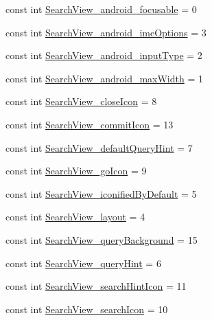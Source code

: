 \begin{CompactItemize}
\item 
const int \hyperlink{class__2doo_1_1_droid_1_1_resource_1_1_styleable_ad82578148e9f3d9db733a529f258051}{SearchView\_\-android\_\-focusable} = 0
\item 
const int \hyperlink{class__2doo_1_1_droid_1_1_resource_1_1_styleable_e42e1c73748dd445937558d5b44b7cfa}{SearchView\_\-android\_\-imeOptions} = 3
\item 
const int \hyperlink{class__2doo_1_1_droid_1_1_resource_1_1_styleable_19b755515da7d03a9b3090f07da97edc}{SearchView\_\-android\_\-inputType} = 2
\item 
const int \hyperlink{class__2doo_1_1_droid_1_1_resource_1_1_styleable_00abbba65ed503719be306f36703dfbc}{SearchView\_\-android\_\-maxWidth} = 1
\item 
const int \hyperlink{class__2doo_1_1_droid_1_1_resource_1_1_styleable_fe8b9e97dac1b0fb5b2df79c33dcc0ba}{SearchView\_\-closeIcon} = 8
\item 
const int \hyperlink{class__2doo_1_1_droid_1_1_resource_1_1_styleable_dbdef943067bd2a3dfb30eef7b5f1a0f}{SearchView\_\-commitIcon} = 13
\item 
const int \hyperlink{class__2doo_1_1_droid_1_1_resource_1_1_styleable_146beb29e45816837455fae2ac01a897}{SearchView\_\-defaultQueryHint} = 7
\item 
const int \hyperlink{class__2doo_1_1_droid_1_1_resource_1_1_styleable_e6bf16e6759447dfb7415ce257c56288}{SearchView\_\-goIcon} = 9
\item 
const int \hyperlink{class__2doo_1_1_droid_1_1_resource_1_1_styleable_0e99b7bab0fca00e621668def41b7585}{SearchView\_\-iconifiedByDefault} = 5
\item 
const int \hyperlink{class__2doo_1_1_droid_1_1_resource_1_1_styleable_0b906dbbe281f31c7bef780374f00ada}{SearchView\_\-layout} = 4
\item 
const int \hyperlink{class__2doo_1_1_droid_1_1_resource_1_1_styleable_c028aaffb8985cc203298dc181ccd6c0}{SearchView\_\-queryBackground} = 15
\item 
const int \hyperlink{class__2doo_1_1_droid_1_1_resource_1_1_styleable_e4f8b7082a0387904df347aa8af66c4d}{SearchView\_\-queryHint} = 6
\item 
const int \hyperlink{class__2doo_1_1_droid_1_1_resource_1_1_styleable_1e5292b4bdba065347c5c8bc1b8f5ef4}{SearchView\_\-searchHintIcon} = 11
\item 
const int \hyperlink{class__2doo_1_1_droid_1_1_resource_1_1_styleable_61c93441334f79e0b8a2f18d8fd48062}{SearchView\_\-searchIcon} = 10
\item 

\end{CompactItemize}
